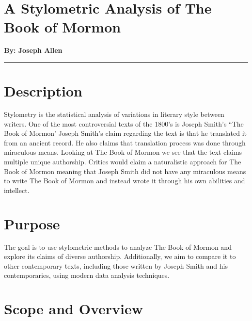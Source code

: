 \documentclass[
  letterpaper,
  DIV=11,
  numbers=noendperiod]{scrartcl}
\author{}
\date{}
\begin{document}
\ifdefined\Shaded\renewenvironment{Shaded}{\begin{tcolorbox}[enhanced, frame hidden, boxrule=0pt, sharp corners, interior hidden, breakable, borderline west={3pt}{0pt}{shadecolor}]}{\end{tcolorbox}}\fi

\hypertarget{a-stylometric-analysis-of-the-book-of-mormon}{%
\section{A Stylometric Analysis of The Book of
Mormon}\label{a-stylometric-analysis-of-the-book-of-mormon}}

\textbf{By: Joseph Allen}

\begin{center}\rule{0.5\linewidth}{0.5pt}\end{center}

\hypertarget{description}{%
\section{Description}\label{description}}

Stylometry is the statistical analysis of variations in literary style
between writers. One of the most controversial texts of the 1800's is
Joseph Smith's ``The Book of Mormon' Joseph Smith's claim regarding the
text is that he translated it from an ancient record. He also claims
that translation process was done through miraculous means. Looking at
The Book of Mormon we see that the text claims multiple unique
authorship. Critics would claim a naturalistic approach for The Book of
Mormon meaning that Joseph Smith did not have any miraculous means to
write The Book of Mormon and instead wrote it through his own abilities
and intellect.

\hypertarget{purpose}{%
\section{Purpose}\label{purpose}}

The goal is to use stylometric methods to analyze The Book of Mormon and
explore its claims of diverse authorship. Additionally, we aim to
compare it to other contemporary texts, including those written by
Joseph Smith and his contemporaries, using modern data analysis
techniques.

\hypertarget{scope-and-overview}{%
\section{Scope and Overview}\label{scope-and-overview}}
\end{document}
